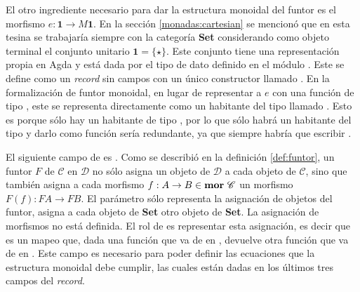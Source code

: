 El otro ingrediente necesario para dar la estructura monoidal del funtor es el morfismo $e : \mathbf{1} \rightarrow \mathit{M} \mathbf{1}$. En la sección \ref{monadas:cartesian} se mencionó que en esta tesina se trabajaría siempre con la categoría \textbf{Set} considerando como objeto terminal el conjunto unitario $\mathbf{1} = \{\star\}$. Este conjunto tiene una representación propia en Agda y está dada por el tipo de dato \AgdaDatatype{$\top$} definido en el módulo . Este se define como un \textit{record} sin campos con un único constructor llamado . En la formalización de funtor monoidal, en lugar de representar a $e$ con una función de tipo \AgdaDatatype{$\top$} \AgdaSymbol{$\rightarrow$}  \AgdaDatatype{$\top$}, este se representa directamente como un habitante del tipo  \AgdaDatatype{$\top$} llamado . Esto es porque sólo hay un habitante de tipo \AgdaDatatype{$\top$}, por lo que sólo habrá un habitante del tipo  \AgdaDatatype{$\top$} y darlo como función sería redundante, ya que siempre habría que escribir  .

El siguiente campo de  es . Como se describió en la definición \ref{def:funtor}, un funtor $\mathit{F}$ de $\mathscr{C}$ en $\mathscr{D}$ no sólo asigna un objeto de $\mathscr{D}$ a cada objeto de $\mathscr{C}$, sino que también asigna a cada morfismo $f : A \rightarrow B \in \text{\bf mor} \ \mathscr{C}$ un morfismo $\mathit{F}(f) : \mathit{F} A \rightarrow \mathit{F} B$. El parámetro  sólo representa la asignación de objetos del funtor, asigna a cada objeto de \textbf{Set} otro objeto de \textbf{Set}. La asignación de morfismos no está definida. El rol de  es representar esta asignación, es decir que es un mapeo que, dada una función que va de  en , devuelve otra función que va de  en . Este campo es necesario para poder definir las ecuaciones que la estructura monoidal debe cumplir, las cuales están dadas en los últimos tres campos del \textit{record}.

